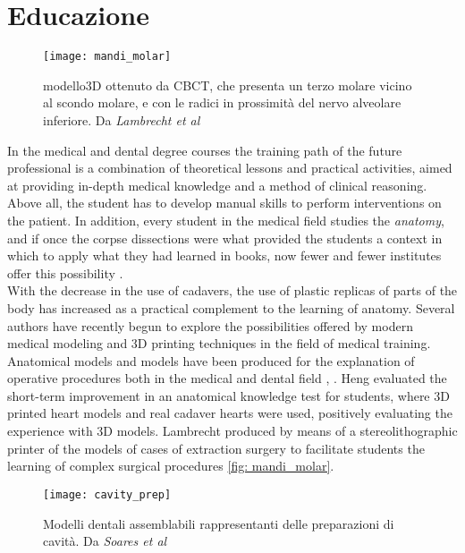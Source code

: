 \section{Educazione}
\begin{wrapfigure} {R} {0.4\textwidth}
\vspace{-20pt}
	\begin{center}
	\texttt{[image: mandi\_molar]}
    \caption{modello3D ottenuto da CBCT, che presenta un terzo molare vicino al scondo molare, e con le radici in prossimità del nervo alveolare inferiore. Da \emph{Lambrecht et al} \parencite{Reference69}}
    \label{fig:mandi_molar}
    \end{center}
\vspace{-20pt}
\end{wrapfigure}
In the medical and dental degree courses the training path of the future professional is a combination of theoretical lessons and practical activities, aimed at providing in-depth medical knowledge and a method of clinical reasoning. Above all, the student has to develop manual skills to perform interventions on the patient. In addition, every student in the medical field studies the \emph{anatomy}, and if once the corpse dissections were what provided the students a context in which to apply what they had learned in books, now fewer and fewer institutes offer this possibility \parencite{Reference67}. \\
With the decrease in the use of cadavers, the use of plastic replicas of parts of the body has increased as a practical complement to the learning of anatomy. Several authors have recently begun to explore the possibilities offered by modern medical modeling and 3D printing techniques in the field of medical training. \\ Anatomical models and models have been produced for the explanation of operative procedures both in the medical and dental field \parencite{Reference66 }, \parencite{Reference70}. Heng \parencite{Reference67} evaluated the short-term improvement in an anatomical knowledge test for students, where 3D printed heart models and real cadaver hearts were used, positively evaluating the experience with 3D models. Lambrecht \parencite{Reference69} produced by means of a stereolithographic printer of the models of cases of extraction surgery to facilitate students the learning of complex surgical procedures \ref{fig: mandi_molar}.
\begin{figure}[h]
\vspace{-10pt}
	\begin{center}
	\texttt{[image: cavity\_prep]}
    \caption{Modelli dentali assemblabili rappresentanti delle preparazioni di cavità. Da \emph{Soares et al} \parencite{Reference71}}
    \label{fig:cavity_prep}
    \end{center}
\vspace{-20pt}
\end{figure}
 
